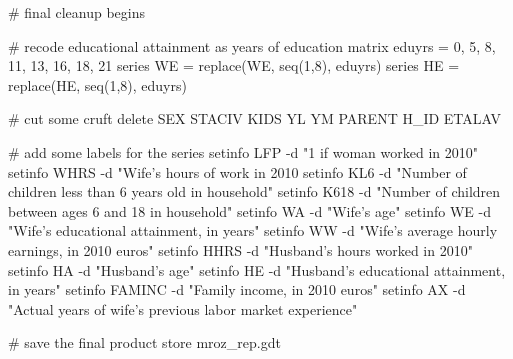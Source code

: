 \begin{code}
# final cleanup begins

# recode educational attainment as years of education
matrix eduyrs = {0, 5, 8, 11, 13, 16, 18, 21}
series WE = replace(WE, seq(1,8), eduyrs)
series HE = replace(HE, seq(1,8), eduyrs)

# cut some cruft
delete SEX STACIV KIDS YL YM PARENT H_ID ETALAV

# add some labels for the series
setinfo LFP -d "1 if woman worked in 2010"
setinfo WHRS -d "Wife's hours of work in 2010
setinfo KL6 -d "Number of children less than 6 years old in household"
setinfo K618 -d "Number of children between ages 6 and 18 in household"
setinfo WA -d "Wife's age"
setinfo WE -d "Wife's educational attainment, in years"
setinfo WW -d "Wife's average hourly earnings, in 2010 euros"
setinfo HHRS -d "Husband's hours worked in 2010"
setinfo HA -d "Husband's age"
setinfo HE -d "Husband's educational attainment, in years"
setinfo FAMINC -d "Family income, in 2010 euros"
setinfo AX -d "Actual years of wife's previous labor market experience"

# save the final product
store mroz_rep.gdt
\end{code}


